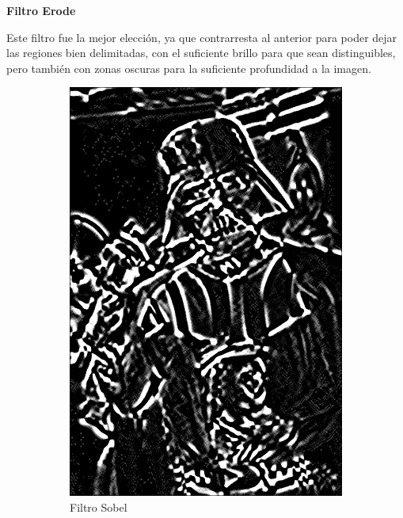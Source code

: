 \documentclass[12pt, a4paper]{article}
\begin{document}
\textbf{Filtro Erode}

Este filtro fue la mejor elección, ya que contrarresta al anterior para poder dejar las regiones bien delimitadas, con el suficiente brillo para que sean distinguibles, pero también con zonas oscuras para la suficiente profundidad a la imagen.

\begin{figure}[!ht]
    \centering
    \begin{subfigure}{0.23\textwidth}
        \includegraphics[width=\textwidth]{img/sobel-res.png}
        \caption{Filtro Sobel}
    \end{subfigure}
    \hfill
    \begin{subfigure}{0.23\textwidth}

\end{subfigure}
\end{figure}
\end{document}
